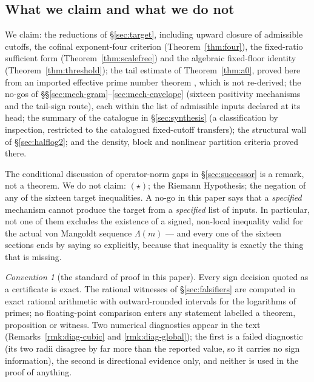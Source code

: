 \documentclass[11pt]{amsart}
\theoremstyle{definition}
\theoremstyle{remark}
\newtheorem{convention}[theorem]{Convention}
\theoremstyle{definition}
\begin{document}
\subsection*{What we claim and what we do not}

We claim: the reductions of \S\ref{sec:target}, including upward closure of admissible cutoffs,
the cofinal exponent-four criterion (Theorem~\ref{thm:four}), the fixed-ratio sufficient form
(Theorem~\ref{thm:scalefree}) and the algebraic fixed-floor identity
(Theorem~\ref{thm:threshold}); the tail estimate of Theorem~\ref{thm:a0}, proved here from an imported effective prime number theorem \cite{JohnstonYang}, which is not re-derived; the no-gos of
\S\S\ref{sec:mech-gram}--\ref{sec:mech-envelope} (sixteen positivity mechanisms and the tail-sign route), each within the list of admissible inputs
declared at its head; the summary of the catalogue in \S\ref{sec:synthesis} (a classification by inspection,
restricted to the catalogued fixed-cutoff transfers); the structural wall
of \S\ref{sec:halflog2}; and the density, block and nonlinear partition criteria proved there.

The conditional discussion of operator-norm gaps in
\S\ref{sec:successor} is a remark, not a theorem. We do not claim: $(\star)$; the Riemann Hypothesis; the negation of any of the sixteen target
inequalities. A no-go in this paper says that a \emph{specified} mechanism cannot produce the
target from a \emph{specified} list of inputs. In particular, not one of them excludes the
existence of a signed, non-local inequality valid for the actual von Mangoldt sequence
$\Lambda(m)$ --- and every one of the sixteen sections ends by saying so explicitly, because
that inequality is exactly the thing that is missing.

\begin{convention}[the standard of proof in this paper]\label{conv:standard}
Every sign decision quoted as a certificate is exact. The rational witnesses of
\S\ref{sec:falsifiers} are computed in exact rational arithmetic with outward-rounded intervals
for the logarithms of primes; no floating-point comparison enters any statement labelled a
theorem, proposition or witness. Two numerical diagnostics appear in the text
(Remarks~\ref{rmk:diag-cubic} and \ref{rmk:diag-global}); the first is a failed diagnostic (its two radii disagree
by far more than the reported value, so it carries no sign information), the second is directional evidence only,
and neither is used in the proof of anything.
\end{convention}
\end{document}
